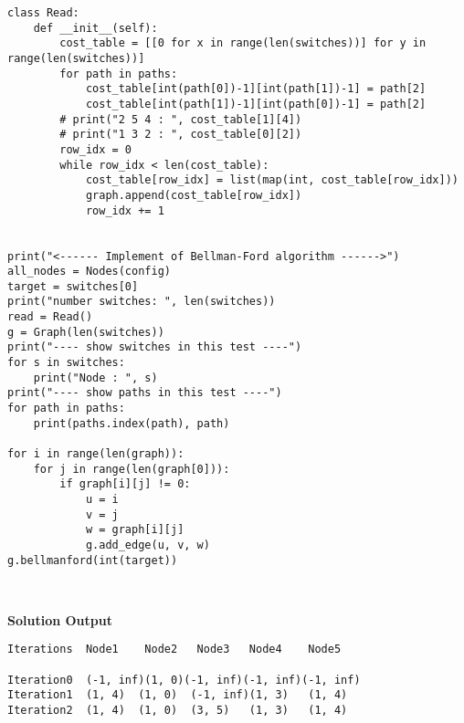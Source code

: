 \documentclass[12pt]{article}
\begin{document}
\begin{verbatim}
class Read:
    def __init__(self):
        cost_table = [[0 for x in range(len(switches))] for y in range(len(switches))] 
        for path in paths:
            cost_table[int(path[0])-1][int(path[1])-1] = path[2]
            cost_table[int(path[1])-1][int(path[0])-1] = path[2]
        # print("2 5 4 : ", cost_table[1][4])
        # print("1 3 2 : ", cost_table[0][2])
        row_idx = 0
        while row_idx < len(cost_table):
            cost_table[row_idx] = list(map(int, cost_table[row_idx]))
            graph.append(cost_table[row_idx])
            row_idx += 1


print("<------ Implement of Bellman-Ford algorithm ------>")
all_nodes = Nodes(config)
target = switches[0]
print("number switches: ", len(switches))
read = Read()
g = Graph(len(switches))
print("---- show switches in this test ----")
for s in switches:
    print("Node : ", s)
print("---- show paths in this test ----")
for path in paths:
    print(paths.index(path), path)

for i in range(len(graph)):
    for j in range(len(graph[0])):
        if graph[i][j] != 0:
            u = i
            v = j
            w = graph[i][j]
            g.add_edge(u, v, w)
g.bellmanford(int(target))



\end{verbatim}
\noindent\textbf{Solution Output}
\begin{lstlisting}
Iterations	Node1	 Node2	 Node3	 Node4	  Node5

Iteration0	(-1, inf)(1, 0)(-1, inf)(-1, inf)(-1, inf)
Iteration1	(1, 4)	(1, 0)	(-1, inf)(1, 3)	  (1, 4)
Iteration2	(1, 4)	(1, 0)	(3, 5)	 (1, 3)	  (1, 4)
\end{lstlisting}


\printbibliography
\end{document}

